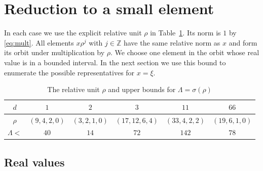 \documentclass[a4paper,11pt]{article}
\theoremstyle{plain}
\theoremstyle{definition}
\theoremstyle{remark}
\numberwithin{equation}{section}
\numberwithin{table}{section}
\newcommand{\Z}{\mathbb{Z}}
\begin{document}
\section{Reduction to a small element}\label{sec:window}

In each case we use the explicit relative unit $\rho$ in Table~\ref{tab:rho}. Its norm is $1$ by \eqref{eq:mult}.
All elements $x\rho^j$ with $j\in\Z$ have the same relative norm as $x$ and form its orbit under multiplication by $\rho$. We choose one element in the orbit whose real value is in a bounded interval. In the next section we use this bound to enumerate the possible representatives for $x=\xi$.

\begin{table}[htbp]
\centering
\caption{The relative unit $\rho$ and upper bounds for $\Lambda=\sigma(\rho)$}\label{tab:rho}
\begin{tabular}{cccccc}
\toprule
$d$ & $1$ & $2$ & $3$ & $11$ & $66$\\
\midrule
$\rho$ & $(9,4,2,0)$ & $(3,2,1,0)$ & $(17,12,6,4)$ & $(33,4,2,2)$ & $(19,6,1,0)$\\
$\Lambda<$ & $40$ & $14$ & $72$ & $142$ & $78$\\
\bottomrule
\end{tabular}
\end{table}

\subsection{Real values}
\end{document}
